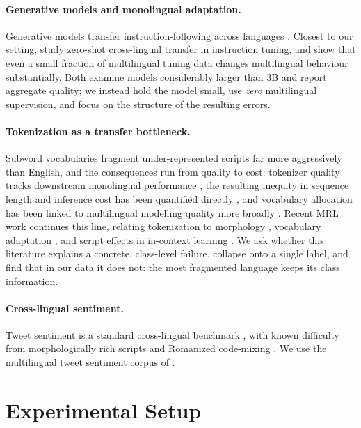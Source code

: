 \documentclass[11pt]{article}
\begin{document}
\paragraph{Generative models and monolingual adaptation.}
Generative models transfer instruction-following across languages
\citep{winata2021fewshot,lin2022xglm,muennighoff2023crosslingual,ustun2024aya}.
Closest to our setting, \citet{chirkova2024zeroshot} study zero-shot cross-lingual
transfer in instruction tuning, and \citet{shaham2024pinch} show that even a small
fraction of multilingual tuning data changes multilingual behaviour substantially.
Both examine models considerably larger than 3B and report aggregate quality; we
instead hold the model small, use \emph{zero} multilingual supervision, and focus
on the structure of the resulting errors.

\paragraph{Tokenization as a transfer bottleneck.}
Subword vocabularies \citep{sennrich2016bpe,kudo2018sentencepiece} fragment
under-represented scripts far more aggressively than English, and the
consequences run from quality to cost: tokenizer quality tracks downstream
monolingual performance \citep{rust2021good}, the resulting inequity in sequence
length and inference cost has been quantified directly
\citep{petrov2023tokenizers,ahia2023cost}, and vocabulary allocation has been
linked to multilingual modelling quality more broadly
\citep{limisiewicz2023tokenization}. Recent MRL work continues this line, relating tokenization to
morphology \citep{poelman2025morphology}, vocabulary adaptation
\citep{downey2023embedding}, and script effects in in-context learning
\citep{ma2025transliteration}. We ask whether this literature explains a
concrete, class-level failure, collapse onto a single label, and find that in our
data it does not: the most fragmented language keeps its class information.

\paragraph{Cross-lingual sentiment.}
Tweet sentiment is a standard cross-lingual benchmark
\citep{rosenthal2017semeval,barbieri2020tweeteval}, with known difficulty from
morphologically rich scripts and Romanized code-mixing
\citep{patwa2020semeval}. We use the multilingual tweet sentiment corpus of
\citet{barbieri2022xlmt}.

\section{Experimental Setup}
\label{sec:setup}
\end{document}
